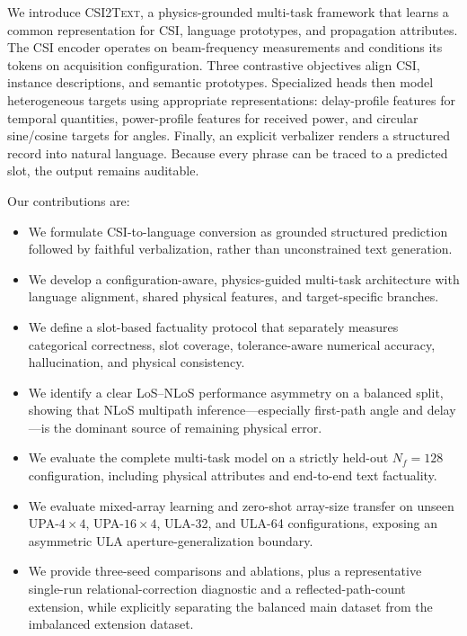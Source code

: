 \documentclass{article}
\newcommand{\model}{\textsc{CSI2Text}}
\begin{document}
We introduce \model, a physics-grounded multi-task framework that learns a common representation for CSI, language prototypes, and propagation attributes.
The CSI encoder operates on beam-frequency measurements and conditions its tokens on acquisition configuration.
Three contrastive objectives align CSI, instance descriptions, and semantic prototypes.
Specialized heads then model heterogeneous targets using appropriate representations: delay-profile features for temporal quantities, power-profile features for received power, and circular sine/cosine targets for angles.
Finally, an explicit verbalizer renders a structured record into natural language.
Because every phrase can be traced to a predicted slot, the output remains auditable.

Our contributions are:
\begin{itemize}
    \item We formulate CSI-to-language conversion as grounded structured prediction followed by faithful verbalization, rather than unconstrained text generation.
    \item We develop a configuration-aware, physics-guided multi-task architecture with language alignment, shared physical features, and target-specific branches.
    \item We define a slot-based factuality protocol that separately measures categorical correctness, slot coverage, tolerance-aware numerical accuracy, hallucination, and physical consistency.
    \item We identify a clear LoS--NLoS performance asymmetry on a balanced split, showing that NLoS multipath inference---especially first-path angle and delay---is the dominant source of remaining physical error.
    \item We evaluate the complete multi-task model on a strictly held-out $N_f=128$ configuration, including physical attributes and end-to-end text factuality.
    \item We evaluate mixed-array learning and zero-shot array-size transfer on unseen UPA-$4{\times}4$, UPA-$16{\times}4$, ULA-32, and ULA-64 configurations, exposing an asymmetric ULA aperture-generalization boundary.
    \item We provide three-seed comparisons and ablations, plus a representative single-run relational-correction diagnostic and a reflected-path-count extension, while explicitly separating the balanced main dataset from the imbalanced extension dataset.
\end{itemize}
\end{document}
